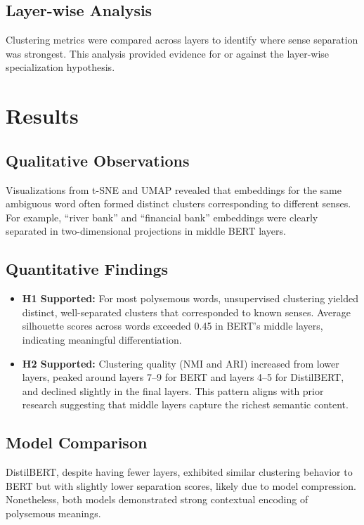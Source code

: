 \documentclass{template}
\begin{document}
\subsection*{Layer-wise Analysis}
Clustering metrics were compared across layers to identify where sense separation was strongest. This analysis provided evidence for or against the layer-wise specialization hypothesis.


\section*{Results}
\subsection*{Qualitative Observations}
Visualizations from t-SNE and UMAP revealed that embeddings for the same ambiguous word often formed distinct clusters corresponding to different senses. For example, ``river bank'' and ``financial bank'' embeddings were clearly separated in two-dimensional projections in middle BERT layers.

\subsection*{Quantitative Findings}
\begin{itemize}
  \item \textbf{H1 Supported:} For most polysemous words, unsupervised clustering yielded distinct, well-separated clusters that corresponded to known senses. Average silhouette scores across words exceeded 0.45 in BERT's middle layers, indicating meaningful differentiation.
  \item \textbf{H2 Supported:} Clustering quality (NMI and ARI) increased from lower layers, peaked around layers 7--9 for BERT and layers 4--5 for DistilBERT, and declined slightly in the final layers. This pattern aligns with prior research suggesting that middle layers capture the richest semantic content.
\end{itemize}

\subsection*{Model Comparison}
DistilBERT, despite having fewer layers, exhibited similar clustering behavior to BERT but with slightly lower separation scores, likely due to model compression. Nonetheless, both models demonstrated strong contextual encoding of polysemous meanings.
\end{document}
